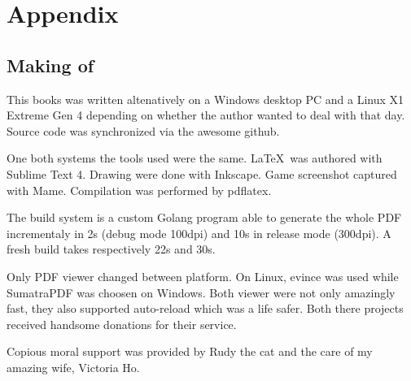 \chapter{Appendix} 

\section{Making of}

This books was written altenatively on a Windows desktop PC and a Linux X1 Extreme Gen 4 depending on whether the author wanted to deal with  that day. Source code was synchronized via the awesome github.

One both systems the tools used were the same. \LaTeX\ was authored with Sublime Text 4. Drawing were done with Inkscape. Game screenshot captured with Mame. Compilation was performed by pdflatex.

The build system is a custom Golang program able to generate the whole PDF incrementaly in 2s (debug mode 100dpi) and 10s in release mode (300dpi). A fresh build takes respectively 22s and 30s.

Only PDF viewer changed between platform. On Linux, evince was used while SumatraPDF was choosen on Windows. Both viewer were not only amazingly fast, they also supported auto-reload which was a life safer. Both there projects received handsome donations for their service.

Copious moral support was provided by Rudy the cat and the care of my amazing wife, Victoria Ho.
